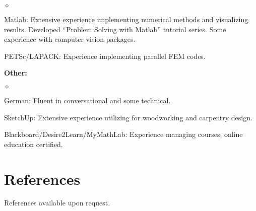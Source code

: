 \documentclass[margin,line,pifont,palatino,10pt]{res}
\begin{document}
\begin{resume}
\begin{list}{$\diamond$}{\leftmargin=0.15in}
	\item Matlab:  Extensive experience implementing numerical methods and visualizing results.  Developed ``Problem Solving with Matlab'' tutorial series.  Some experience with computer vision packages.
	\item PETSc/LAPACK:  Experience implementing parallel FEM codes.
\end{list}
{\bf Other:}
\begin{list}{$\diamond$}{\leftmargin=0.15in}
	\item German:  Fluent in conversational and some technical.
	\item SketchUp:  Extensive experience utilizing for woodworking and carpentry design.
	\item Blackboard/Desire2Learn/MyMathLab:  Experience managing courses; online education certified.
\end{list}

\vspace{1.5mm}
\section{\sc References}
References available upon request.

\end{resume}
\end{document}
